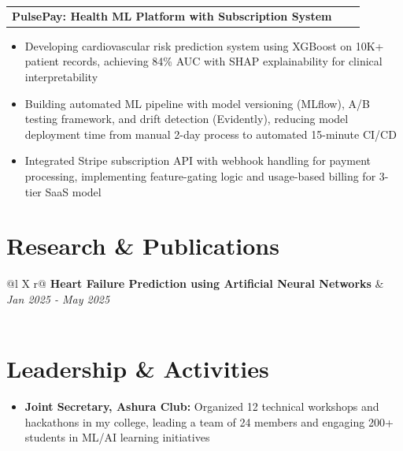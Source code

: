 \documentclass[a4paper,10pt]{article}
\makeatletter
\newenvironment{joblong}[2]
    {
    \begin{tabularx}{\linewidth}{@{}l >{\raggedright\arraybackslash}X r@{}}
    \textbf{#1} & \hfill &  #2 \\[1.0pt]
    \end{tabularx}
    \begin{minipage}[t]{\linewidth}
    \begin{itemize}[nosep,after=\strut, leftmargin=1em, itemsep=1.5pt]
    }
    {
    \end{itemize}
    \end{minipage}    
    }
\makeatother
\begin{document}
\begin{joblong}{PulsePay: Health ML Platform with Subscription System}{}
\item Developing cardiovascular risk prediction system using XGBoost on 10K+ patient records, achieving 84\% AUC with SHAP explainability for clinical interpretability
\item Building automated ML pipeline with model versioning (MLflow), A/B testing framework, and drift detection (Evidently), reducing model deployment time from manual 2-day process to automated 15-minute CI/CD
\item Integrated Stripe subscription API with webhook handling for payment processing, implementing feature-gating logic and usage-based billing for 3-tier SaaS model
\end{joblong}


\section{Research \& Publications}

\begin{tabularx}{\linewidth}{@{}l X r@{}}
\textbf{Heart Failure Prediction using Artificial Neural Networks} & \hfill \textit{Jan 2025 - May 2025} \\[2.5pt]
 \\
\end{tabularx}

\section{Leadership \& Activities}
\begin{itemize}[nosep,after=\strut, leftmargin=1em, itemsep=1pt]
\item[] \textbf{Joint Secretary, Ashura Club:} Organized 12 technical workshops and hackathons in my college, leading a team of 24 members and engaging 200+ students in ML/AI learning initiatives
\end{itemize}

\vfill
{}
\end{document}

